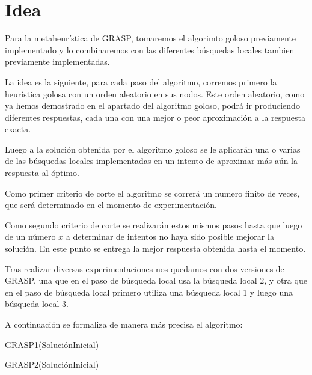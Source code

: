 \section{Idea}

Para la metaheurística de GRASP, tomaremos el algorimto goloso previamente implementado y lo combinaremos con las diferentes búsquedas locales tambien previamente implementadas.

La idea es la siguiente, para cada paso del algoritmo, corremos primero la heurística golosa con un orden aleatorio en sus nodos. Este orden aleatorio, como ya hemos demostrado en el apartado del algoritmo goloso, podrá ir produciendo diferentes respuestas, cada una con una mejor o peor aproximación a la respuesta exacta.

Luego a la solución obtenida por el algoritmo goloso se le aplicarán una o varias de las búsquedas locales implementadas en un intento de aproximar más aún la respuesta al óptimo.

Como primer criterio de corte el algoritmo se correrá un numero finito de veces, que será determinado en el momento de experimentación.

Como segundo criterio de corte se realizarán estos mismos pasos hasta que luego de un número $x$ a determinar de intentos no haya sido posible mejorar la solución. En este punto se entrega la mejor respuesta obtenida hasta el momento.

Tras realizar diversas experimentaciones nos quedamos con dos versiones de GRASP, una que en el paso de búsqueda local usa la búsqueda local 2, y otra que en el paso de búsqueda local primero utiliza una búsqueda local 1 y luego una búsqueda local 3.

A continuación se formaliza de manera más precisa el algoritmo:

\begin{algorithm}
  	\begin{algorithmic}[1]\parskip=1mm
		 \caption{ GRASP1(SoluciónInicial) }
	\end{algorithmic}
\end{algorithm}

\begin{algorithm}
  	\begin{algorithmic}[1]\parskip=1mm
		 \caption{ GRASP2(SoluciónInicial) }
	\end{algorithmic}
\end{algorithm}


